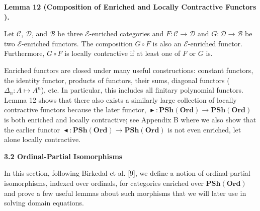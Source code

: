 \documentclass[10pt,a4paper]{article}
\begin{document}
 
 
 
\par\medskip\noindent\textbf{Lemma 12 (Composition of Enriched and Locally Contractive Functors ).}\par
 
 
Let $\mathcal{C}$, $\mathcal{D}$, and $\mathcal{B}$ be three $\mathcal{E}$-enriched categories and $F:\mathcal{C}\to\mathcal{D}$ and $G:\mathcal{D}\to\mathcal{B}$ be two $\mathcal{E}$-enriched functors. The composition $G\circ F$ is also an $\mathcal{E}$-enriched functor. Furthermore, $G\circ F$ is locally contractive if at least one of $F$ or $G$ is.\par
 
 
 
 
Enriched functors are closed under many useful constructions: constant functors, the identity functor, products of functors, their sums, diagonal functors ($\Delta_{n}:A\mapsto A^{n}$), etc. In particular, this includes all finitary polynomial functors. Lemma 12 shows that there also exists a similarly large collection of locally contractive functors because the later functor, $\mathop{\blacktriangleright}:\mathbf{PSh}(\mathbf{Ord})\to\mathbf{PSh}(\mathbf{Ord})$ is both enriched and locally contractive; see Appendix B where we also show that the earlier functor $\mathop{\blacktriangleleft}:\mathbf{PSh}(\mathbf{Ord})\to\mathbf{PSh}(\mathbf{Ord})$ is not even enriched, let alone locally contractive.\par
 
 
 
 
\par\medskip\noindent\textbf{3.2 Ordinal-Partial Isomorphisms}\par
 
 
In this section, following Birkedal et al. [9], we define a notion of ordinal-partial isomorphisms, indexed over ordinals, for categories enriched over $\mathbf{PSh}(\mathbf{Ord})$ and prove a few useful lemmas about such morphisms that we will later use in solving domain equations.\par
 
\end{document}
